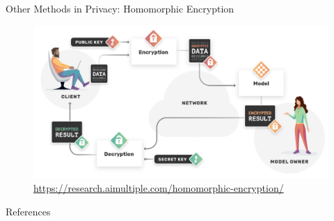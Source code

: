 \documentclass[12pt,aspectratio=169]{beamer}
\begin{document}
\begin{frame}{Other Methods in Privacy: Homomorphic Encryption}

\begin{figure}
    \centering
    \includegraphics[width=0.9\linewidth]{figures/homomorphic-enc.png}
    \caption{\tiny \url{https://research.aimultiple.com/homomorphic-encryption/}}
\end{figure}

\end{frame}

\fontsize{11pt}{0.5cm}\selectfont
\renewcommand{\bibsection}{}

\begin{frame}{References}

  
  

\end{frame}
\end{document}
